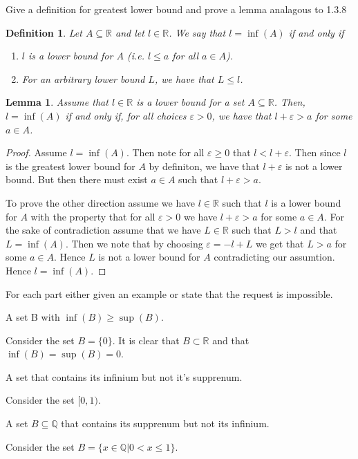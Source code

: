 \documentclass[11pt,largemargins]{homework}
\newcommand{\R}{\mathbb{R}}
\newcommand{\Q}{\mathbb{Q}}
\newcommand{\eps}{\varepsilon}
\begin{document}
\maketitle

\question
Give a definition for greatest lower bound and prove a lemma analagous to 1.3.8 

\newtheorem{definition}{Definition}
\begin{definition}
    
 Let $A \subseteq \R$ and let $l \in \R$. We say that $l = \inf(A)$ if and only if 
\begin{enumerate}
    \item $l$ is a lower bound for $A$ (i.e. $l \leq a$ for all $a \in A$).
    \item For an arbitrary lower bound $L$, we have that $L \leq l$. 
\end{enumerate}
\end{definition}
\newtheorem{lemma}{Lemma}[definition]
\begin{lemma}
    Assume that $l \in \R$ is a lower bound for a set $A \subseteq \R$. Then, $l = \inf(A)$ if and only if, for all choices $\eps > 0$, we have that 
    $l + \eps > a$ for some $a \in A$. 
\end{lemma}


\begin{proof}
    Assume $l = \inf(A)$. Then note for all $\eps \geq 0$ that $l < l + \eps$. Then since $l$ is the greatest lower bound for $A$
    by definiton, we have that $l + \eps$ is not a lower bound. But then there must exist $a \in A$ such that $l + \eps > a$. 

    To prove the other direction assume we have $l \in \R$ such that $l$ is a lower bound for $A$ with the property that 
    for all $\eps > 0$ we have $l + \eps > a$ for some $a \in A$. For the sake of contradiction assume that we have $L \in \R$ such that $L > l$ and that $L = \inf(A)$. Then we note that by choosing $\eps = -l + L$
    we get that $L > a$ for some $a \in A$. Hence $L$ is not a lower bound for $A$ contradicting our assumtion. Hence $l = \inf(A)$.  
\end{proof}

\question
For each part either given an example or state that the request is impossible. 

\begin{alphaparts}
    \questionpart
        A set B with $\inf(B) \geq \sup(B)$. 

        Consider the set $B = \{0\}$. It is clear that $B \subset \R$ and that $\inf(B) = \sup(B) = 0$. 

    \questionpart
        A set that contains its infinium but not it's supprenum. 

        Consider the set $[0, 1)$. 

    \questionpart
        A set $B \subseteq \Q$ that contains its supprenum but not its infinium. 

        Consider the set $B = \{x \in \Q | 0 < x \leq 1 \} $. 

\end{alphaparts}
\end{document}
